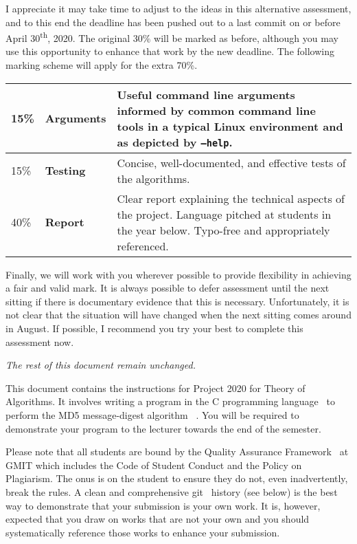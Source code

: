 \documentclass[12pt, a4paper]{article}
\newcommand{\modulename}{Theory of Algorithms}
\newcommand{\projectyear}{2020}
\newcommand{\projectname}{Project \projectyear}
\newcommand{\duedate}{last commit on or before April 30\textsuperscript{th}, 2020}
\begin{document}
\noindent
I appreciate it may take time to adjust to the ideas in this alternative assessment, and to this end the deadline has been pushed out to a \duedate.
The original 30\% will be marked as before, although you may use this opportunity to enhance that work by the new deadline.
The following marking scheme will apply for the extra 70\%.


\begin{center}
  \begin{tabular}{llp{8.4cm}}
    \toprule
    15\% & \textbf{Arguments} & Useful command line arguments informed by common command line tools in a typical Linux environment and as depicted by \texttt{--help}. \\
    \midrule
    15\% & \textbf{Testing} & Concise, well-documented, and effective tests of the algorithms. \\
    \midrule
    40\% & \textbf{Report} & Clear report explaining the technical aspects of the project. Language pitched at students in the year below. Typo-free and appropriately referenced. \\
    \bottomrule
  \end{tabular}
\end{center}


Finally, we will work with you wherever possible to provide flexibility in achieving a fair and valid mark.
It is always possible to defer assessment until the next sitting if there is documentary evidence that this is necessary.
Unfortunately, it is not clear that the situation will have changed when the next sitting comes around in August.
If possible, I recommend you try your best to complete this assessment now.
\vspace{4mm}

\noindent \emph{The rest of this document remain unchanged.}


\maketitle

\noindent
This document contains the instructions for \projectname{} for \modulename{}.
It involves writing a program in the C programming language~\cite{cstandard} to perform the MD5 message-digest algorithm ~\cite{md5}.
You will be required to demonstrate your program to the lecturer towards the end of the semester.

Please note that all students are bound by the Quality Assurance Framework~\cite{gmitqaf} at GMIT which includes the Code of Student Conduct and the Policy on Plagiarism.
The onus is on the student to ensure they do not, even inadvertently, break the rules.
A clean and comprehensive git~\cite{git} history (see below) is the best way to demonstrate that your submission is your own work.
It is, however, expected that you draw on works that are not your own and you should systematically reference those works to enhance your submission.
\end{document}
